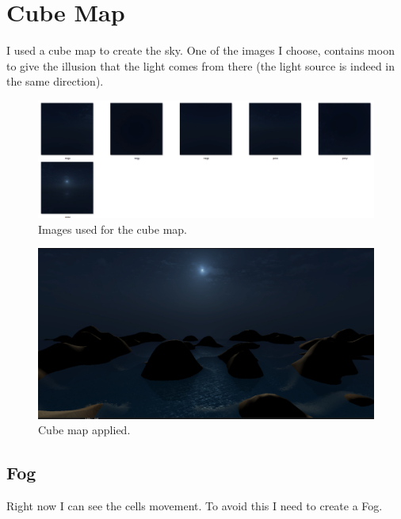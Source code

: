 \section{Cube Map}
I used a cube map to create the sky. One of the images I choose, contains moon to give the illusion that the light comes from there (the light source is indeed in the same direction).

\begin{figure}[hbt!]
	\centering
	\includegraphics[width= 1
	\textwidth]{images/Sky.png}
	\caption{Images used for the cube map.}
\end{figure}

\newpage

\begin{figure}[hbt!]
\centering
\includegraphics[width= 1
\textwidth]{images/Sky2.png}
\caption{Cube map applied.}
\end{figure}

\subsection{Fog}
Right now I can see the cells movement. To avoid this I need to create a Fog.